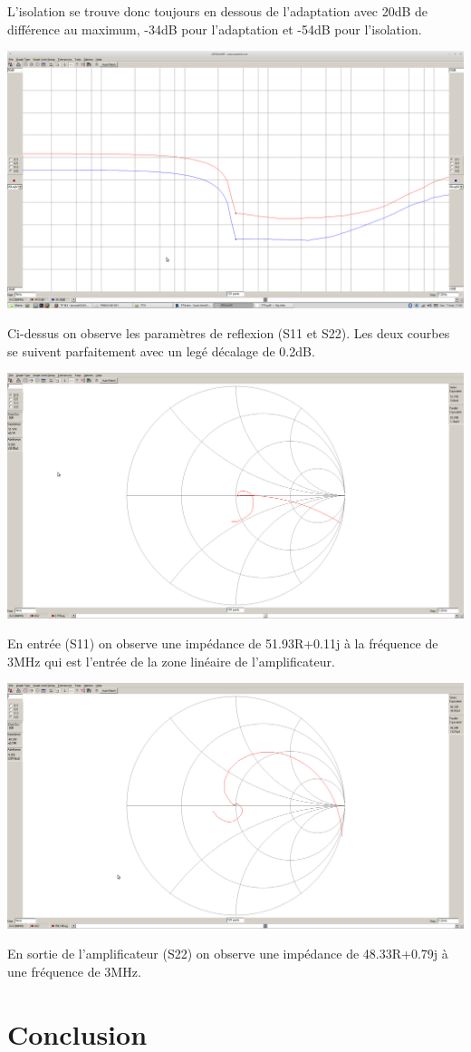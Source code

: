 \documentclass[a4paper,12pt]{report}            %
\begin{document}
L'isolation se trouve donc toujours en dessous de l'adaptation avec 20dB de différence au maximum,
-34dB pour l'adaptation et -54dB pour l'isolation.
\begin{center}\includegraphics[scale = 0.25]{pic/reflexion.png}\\ \end{center}
Ci-dessus on observe les paramètres de reflexion (S11 et S22). Les deux courbes se suivent
parfaitement avec un legé décalage de 0.2dB.
\begin{center}\includegraphics[scale = 0.25]{pic/entree.png}\\ \end{center}
En entrée (S11) on observe une impédance de 51.93R+0.11j à la fréquence de 3MHz qui est l'entrée de 
la zone linéaire de l'amplificateur.
\begin{center}\includegraphics[scale = 0.25]{pic/sortie.png}\\ \end{center}
En sortie de l'amplificateur (S22) on observe une impédance de 48.33R+0.79j à une fréquence de 3MHz.

\chapter{Conclusion}
\end{document}
